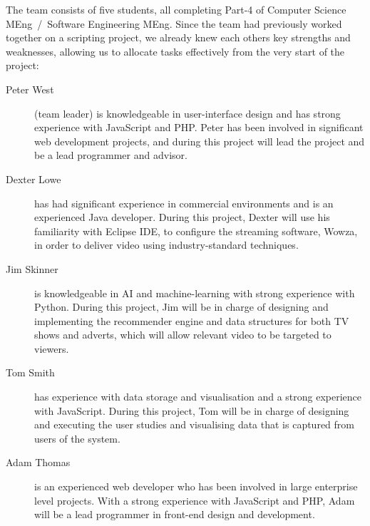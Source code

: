 The team consists of five students, all completing Part-4 of Computer Science MEng~/~Software Engineering MEng. Since the team had previously worked together on a scripting project, we already knew each others key strengths and weaknesses, allowing us to allocate tasks effectively from the very start of the project:

\begin{description}

\item[Peter West] (team leader) is knowledgeable in user-interface design and has strong experience with JavaScript and PHP. Peter has been involved in significant web development projects, and during this project will lead the project and be a lead programmer and advisor.

\item[Dexter Lowe] has had significant experience in commercial environments and is an experienced Java developer. During this project, Dexter will use his familiarity with Eclipse IDE, to configure the streaming software, Wowza, in order to deliver video using industry-standard techniques.

\item[Jim Skinner] is knowledgeable in AI and machine-learning with strong experience with Python. During this project, Jim will be in charge of designing and implementing the recommender engine and data structures for both TV shows and adverts, which will allow relevant video to be targeted to viewers.

\item[Tom Smith] has experience with data storage and visualisation and a strong experience with JavaScript. During this project, Tom will be in charge of designing and executing the user studies and visualising data that is captured from users of the system.

\item[Adam Thomas] is an experienced web developer who has been involved in large enterprise level projects. With a strong experience with JavaScript and PHP, Adam will be a lead programmer in front-end design and development. 

\end{description}
